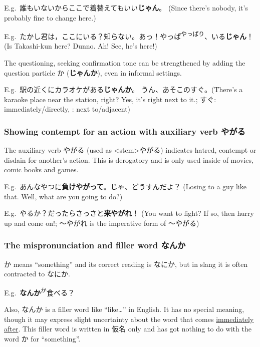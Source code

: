 \documentclass[../nihongo-gakushuu-kyouzai.tex]{subfiles}
\begin{document}
E.g.\ 誰もいないからここで着替えてもいい\textbf{じゃん}。 (Since there's nobody, it's probably fine to change here.)

E.g.\ たかし君は，ここにいる？知らない。あっ！やっぱ\textsuperscript{やっぱり}、いる\textbf{じゃん}！ (Is Takashi-kun here? Dunno. Ah! See, he's here!)

The questioning, seeking confirmation tone can be strengthened by adding the question particle か (\textbf{じゃんか}), even in informal settings.

E.g.\ 駅の近くにカラオケがある\textbf{じゃんか}。 うん、あそこのすぐ。(There's a karaoke place near the station, right? Yes, it's right next to it.; すぐ: immediately/directly, : next to/adjacent)


\subsubsection{Showing contempt for an action with auxiliary verb やがる}
The auxiliary verb やがる (used as <stem>やがる) indicates hatred, contempt or disdain for another's action. This is derogatory and is only used inside of movies, comic books and games.

E.g.\ あんなやつに\textbf{負けやがって}。じゃ、どうすんだよ？ (Losing to a guy like that. Well, what are you going to do?)

E.g.\ やるか？だったらさっさと\textbf{来やがれ}！ (You want to fight? If so, then hurry up and come on!; 〜やがれ is the imperative form of 〜やがる)


\subsubsection{The  mispronunciation and filler word なんか}

か means ``something'' and its correct reading is  なにか, but in slang it is often contracted to なにか.

E.g.\ \textbf{なんか}\textsuperscript{か}食べる？

Also, なんか is a filler word like ``like\dots'' in English. It has no special meaning, though it may express slight uncertainty about the word that comes \ul{immediately after}. This filler word is written in 仮名 only and has got nothing to do with the word か for ``something''.
\end{document}
